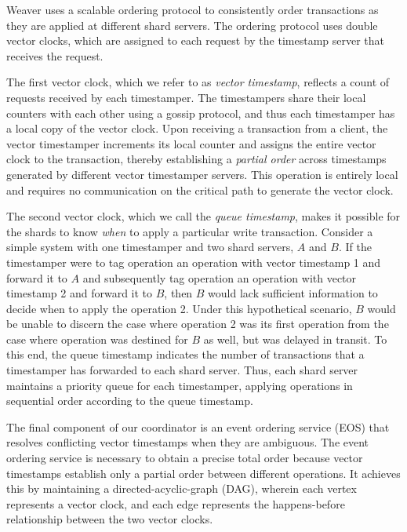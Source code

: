 \documentclass[letterpaper,twocolumn,11pt,tight]{article}
\begin{document}
Weaver uses a scalable ordering protocol to consistently order transactions
    as they are applied at different shard servers.
The ordering protocol uses double vector
    clocks, which are assigned to each request by the timestamp server that
    receives the request.

The first vector clock, which we refer to as \emph{vector timestamp}, reflects
    a count of requests received by each timestamper.
The timestampers share their local counters with each other using a gossip
    protocol, and thus each timestamper has a local copy of the vector clock.
Upon receiving a transaction from a client, the vector timestamper
    increments its local counter and assigns the entire vector clock to the
    transaction, thereby establishing a \emph{partial order} across timestamps
    generated by different vector timestamper servers.
This operation is entirely local and requires no communication on the critical path 
    to generate the vector clock.

The second vector clock, which we call the \emph{queue timestamp}, makes it
    possible for the shards to know \emph{when} to apply a particular write
    transaction.
Consider a simple system with one timestamper and two shard servers, $A$ and
$B$.  If the timestamper were to tag operation an operation with vector
timestamp 1 and forward it to $A$ and subsequently tag operation an operation
with vector timestamp 2 and forward it to $B$, then $B$ would lack sufficient
information to decide when to apply the operation 2.  Under this hypothetical
scenario, $B$ would be unable to discern the case where operation 2 was its
first operation from the case where operation was destined for $B$ as well, but
was delayed in transit.
To this end, the queue timestamp indicates the number of transactions that
    a timestamper has forwarded to each shard server.
Thus, each shard server maintains a priority queue for each timestamper,
    applying operations in sequential order according to the queue timestamp.

The final component of our coordinator is an event ordering service (EOS) that
    resolves conflicting vector timestamps when they are ambiguous.
The event ordering service is necessary to obtain a precise total order because
    vector timestamps establish only a partial order between different
    operations.
It achieves this by maintaining a directed-acyclic-graph (DAG),
wherein each vertex represents a vector clock, and each edge represents the
happens-before relationship between the two vector clocks.
\end{document}
